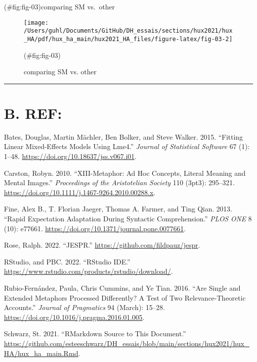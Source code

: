 \documentclass[
]{article}
\newlength{\cslhangindent}
\newlength{\cslentryspacingunit} %
\newenvironment{CSLReferences}[2] %
 {%
  \setlength{\parindent}{0pt}
  \ifodd #1
  \let\oldpar\par
  \def\par{\hangindent=\cslhangindent\oldpar}
  \fi
  \setlength{\parskip}{#2\cslentryspacingunit}
 }%
 {}
\begin{document}
(\#fig:fig-03)comparing SM vs.~other

\begin{figure}[H]
\texttt{[image: /Users/guhl/Documents/GitHub/DH\_essais/sections/hux2021/hux\_HA/pdf/hux\_ha\_main/hux2021\_HA\_files/figure-latex/fig-03-2]} \caption{comparing SM vs. other}(\#fig:fig-03)
\end{figure}

\begin{center}\rule{0.5\linewidth}{0.5pt}\end{center}

\hypertarget{b.-ref}{%
\section*{B. REF:}\label{b.-ref}}

\hypertarget{refs}{}
\begin{CSLReferences}{1}{0}
\leavevmode{}%
Bates, Douglas, Martin Mächler, Ben Bolker, and Steve Walker. 2015. {``Fitting {Linear} {Mixed}-{Effects} {Models} {Using} Lme4.''} \emph{Journal of Statistical Software} 67 (1): 1--48. \url{https://doi.org/10.18637/jss.v067.i01}.

\leavevmode{}%
Carston, Robyn. 2010. {``{XIII}-{Metaphor}: {Ad} {Hoc} {Concepts}, {Literal} {Meaning} and {Mental} {Images}.''} \emph{Proceedings of the Aristotelian Society} 110 (3pt3): 295--321. \url{https://doi.org/10.1111/j.1467-9264.2010.00288.x}.

\leavevmode{}%
Fine, Alex B., T. Florian Jaeger, Thomas A. Farmer, and Ting Qian. 2013. {``Rapid {Expectation} {Adaptation} During {Syntactic} {Comprehension}.''} \emph{PLOS ONE} 8 (10): e77661. \url{https://doi.org/10.1371/journal.pone.0077661}.

\leavevmode{}%
Rose, Ralph. 2022. {``{JESPR}.''} \url{https://github.com/fildpauz/jespr}.

\leavevmode{}%
RStudio, and PBC. 2022. {``{RStudio} {IDE}.''} \url{https://www.rstudio.com/products/rstudio/download/}.

\leavevmode{}%
Rubio-Fernández, Paula, Chris Cummins, and Ye Tian. 2016. {``Are Single and Extended Metaphors Processed Differently? {A} Test of Two {Relevance}-{Theoretic} Accounts.''} \emph{Journal of Pragmatics} 94 (March): 15--28. \url{https://doi.org/10.1016/j.pragma.2016.01.005}.

\leavevmode{}%
Schwarz, St. 2021. {``{RMarkdown} Source to This Document.''} \url{https://github.com/esteeschwarz/DH_essais/blob/main/sections/hux2021/hux_HA/hux_ha_main.Rmd}.

\end{CSLReferences}
\end{document}
